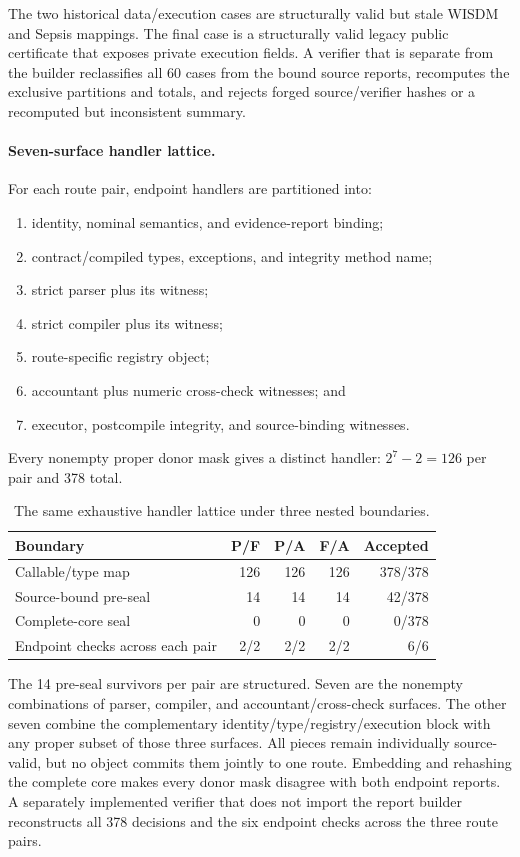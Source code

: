 \documentclass[letterpaper]{article}
\begin{document}
The two historical data/execution cases are structurally valid but stale WISDM
and Sepsis mappings.  The final case is a structurally valid legacy public
certificate that exposes private execution fields.  A verifier that is
separate from the builder reclassifies all 60 cases from the bound source
reports, recomputes the exclusive partitions and totals, and rejects forged
source/verifier hashes or a recomputed but inconsistent summary.

\paragraph{Seven-surface handler lattice.}
For each route pair, endpoint handlers are partitioned into:
\begin{enumerate}
\item identity, nominal semantics, and evidence-report binding;
\item contract/compiled types, exceptions, and integrity method name;
\item strict parser plus its witness;
\item strict compiler plus its witness;
\item route-specific registry object;
\item accountant plus numeric cross-check witnesses; and
\item executor, postcompile integrity, and source-binding witnesses.
\end{enumerate}
Every nonempty proper donor mask gives a distinct handler:
$2^7-2=126$ per pair and 378 total.

\begin{table}[t]
\centering
\footnotesize
\setlength{\tabcolsep}{3pt}
\begin{tabular}{@{}lrrrr@{}}
\toprule
Boundary & P/F & P/A & F/A & Accepted \\
\midrule
Callable/type map & 126 & 126 & 126 & 378/378 \\
Source-bound pre-seal & 14 & 14 & 14 & 42/378 \\
Complete-core seal & 0 & 0 & 0 & 0/378 \\
\midrule
Endpoint checks across each pair & 2/2 & 2/2 & 2/2 & 6/6 \\
\bottomrule
\end{tabular}
\caption{The same exhaustive handler lattice under three nested boundaries.}
\label{tab:supp-handler-ablation}
\end{table}

The 14 pre-seal survivors per pair are structured.  Seven are the nonempty
combinations of parser, compiler, and accountant/cross-check surfaces.  The
other seven combine the complementary identity/type/registry/execution block
with any proper subset of those three surfaces.  All pieces remain
individually source-valid, but no object commits them jointly to one route.
Embedding and rehashing the complete core makes every donor mask disagree with
both endpoint reports.  A separately implemented verifier that does not import
the report builder reconstructs all 378 decisions and the six endpoint checks
across the three route pairs.
\end{document}
